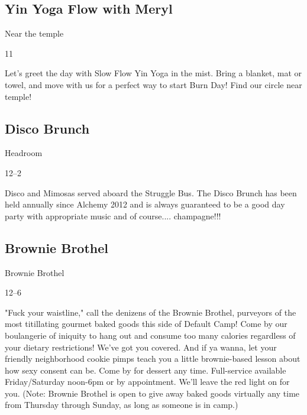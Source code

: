 \begin{multicols}{2}
\subsection*{Yin Yoga Flow with Meryl }
\begin{description}[leftmargin=6em,noitemsep,style=nextline]
	\item[Location:] Near the \gls{temple}
  \item[Times:] 11\am
\end{description}

Let's greet the day with Slow Flow Yin Yoga in the mist. Bring a blanket, mat or towel, and move with us for a perfect way to start Burn Day! 
Find our circle near temple! 

\subsection*{Disco Brunch}
\begin{description}[leftmargin=6em,noitemsep,style=nextline]
	\item[Camp:] Headroom
    \item[Times:] 12--2\pm
\end{description}

Disco and Mimosas served aboard the Struggle Bus. The Disco Brunch has been held annually since Alchemy 2012 and is always guaranteed to be a good day party with appropriate music and of course.... champagne!!!

\subsection*{Brownie Brothel}
\begin{description}[leftmargin=6em,noitemsep,style=nextline]
	\item[Camp:] Brownie Brothel
  \item[Times:] 12--6\pm
\end{description}

"Fuck your waistline," call the denizens of the Brownie Brothel, purveyors of the most titillating gourmet baked goods this side of Default Camp! Come by our boulangerie of iniquity to hang out and consume too many calories regardless of your dietary restrictions! We've got you covered. And if ya wanna, let your friendly neighborhood cookie pimps teach you a little brownie-based lesson about how sexy consent can be. Come by for dessert any time. Full-service available Friday/Saturday noon-6pm or by appointment. We'll leave the red light on for you.
(Note: Brownie Brothel is open to give away baked goods virtually any time from Thursday through Sunday, as long as someone is in camp.)


\end{multicols}
